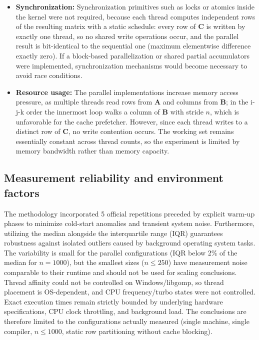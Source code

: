 \documentclass[12pt,a4paper]{article}
\begin{document}
\begin{itemize}
vectorized i-k-j kernel with \texttt{-march=native} (156.8 ms) are
essentially tied. Each technique buys roughly the same $5.5\times$ on this
workload, but they act on different resources (cores vs.\ vector units), so
they are complementary rather than substitutes. The loop reorder alone ---
before any vector instruction executes --- accounts for $3\times$, a reminder
that ``vectorizable'' often means ``cache-friendly'' at the same time.
\item \textbf{Synchronization:} Synchronization primitives such as locks or
atomics inside the kernel were not required, because each thread computes
independent rows of the resulting matrix with a static schedule: every row
of $\mathbf{C}$ is written by exactly one thread, so no shared write
operations occur, and the parallel result is bit-identical to the sequential
one (maximum elementwise difference exactly zero). If a block-based
parallelization or shared partial accumulators were implemented,
synchronization mechanisms would become necessary to avoid race conditions.
\item \textbf{Resource usage:} The parallel implementations increase memory
access pressure, as multiple threads read rows from $\mathbf{A}$ and
columns from $\mathbf{B}$; in the i-j-k order the innermost loop walks a
column of $\mathbf{B}$ with stride $n$, which is unfavorable for the cache
prefetcher. However, since each thread writes to a distinct row of
$\mathbf{C}$, no write contention occurs. The working set remains
essentially constant across thread counts, so the experiment is limited by
memory bandwidth rather than memory capacity.
\end{itemize}

\subsection{Measurement reliability and environment factors}
\label{sec:reliability}

The methodology incorporated 5 official repetitions preceded by explicit
warm-up phases to minimize cold-start anomalies and transient system noise.
Furthermore, utilizing the median alongside the interquartile range (IQR)
guarantees robustness against isolated outliers caused by background
operating system tasks. The variability is small for the parallel
configurations (IQR below 2\% of the median for $n = 1000$), but the
smallest sizes ($n \leq 250$) have measurement noise comparable to their
runtime and should not be used for scaling conclusions. Thread affinity
could not be controlled on Windows/libgomp, so thread placement is
OS-dependent, and CPU frequency/turbo states were not controlled. Exact
execution times remain strictly bounded by underlying hardware
specifications, CPU clock throttling, and background load. The conclusions
are therefore limited to the configurations actually measured (single
machine, single compiler, $n \leq 1000$, static row partitioning without
cache blocking).
\end{document}
